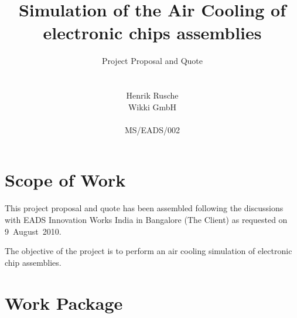 

%
\renewcommand{\ReportType}{Project Proposal and Quote}
\renewcommand{\ReportNo}{MS/EADS/002}
%

%
\title
{\bfseries
  Simulation of the Air Cooling of electronic chips assemblies
}
%
\author
{
     \ReportType\\ \\ \\
     Henrik Rusche\\
     Wikki GmbH\\ \\
     \ReportNo
}
%
\maketitle
%

\section*{Scope of Work}

This project proposal and quote has been assembled following the discussions
with EADS Innovation Works India in Bangalore (The Client) as requested on
9~August~2010.

The objective of the project is to perform an air cooling simulation of
electronic chip assemblies.

\section*{Work Package}

